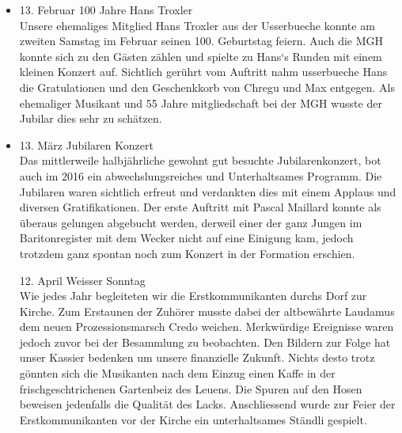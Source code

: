 \begin{history}
\begin{itemize}
            \item 13. Februar 100 Jahre Hans Troxler\\
                  Unsere ehemaliges Mitglied Hans Troxler aus der Usserbueche
                  konnte am zweiten Samstag im Februar seinen 100. Geburtstag
                  feiern. Auch die MGH konnte sich zu den Gästen zählen und
                  spielte zu Hans`s Runden  mit einem kleinen Konzert auf.
                  Sichtlich gerührt vom Auftritt nahm usserbueche Hans die
                  Gratulationen und den Geschenkkorb von Chregu und Max
                  entgegen. Als ehemaliger Musikant und 55 Jahre mitgliedschaft
                  bei der MGH wusste der Jubilar dies sehr zu schätzen.

            \item 13. März Jubilaren Konzert\\
                  Das mittlerweile halbjährliche gewohnt gut besuchte
                  Jubilarenkonzert, bot auch im 2016 ein abwechslungsreiches und
                  Unterhaltsames Programm. Die Jubilaren waren sichtlich erfreut
                  und verdankten dies mit einem Applaus und diversen
                  Gratifikationen. Der erste Auftritt mit Pascal Maillard konnte
                  als überaus gelungen abgebucht werden, derweil einer der ganz
                  Jungen im Baritonregister mit dem Wecker nicht auf eine
                  Einigung kam, jedoch trotzdem ganz spontan noch zum Konzert in
                  der Formation erschien.

                  12. April Weisser Sonntag\\
                  Wie jedes Jahr begleiteten wir die Erstkommunikanten durchs
                  Dorf zur Kirche. Zum Erstaunen der Zuhörer musste dabei der
                  altbewährte Laudamus dem neuen Prozessionsmarsch Credo
                  weichen. Merkwürdige Ereignisse waren jedoch zuvor bei der
                  Besammlung zu beobachten. Den Bildern zur Folge hat unser
                  Kassier bedenken um unsere finanzielle Zukunft. Nichts desto
                  trotz gönnten sich die Musikanten nach dem Einzug einen Kaffe
                  in der frischgeschtrichenen Gartenbeiz des Leuens. Die Spuren
                  auf den Hosen beweisen jedenfalls die Qualität des Lacks.
                  Anschliessend wurde zur Feier der Erstkommunikanten vor der
                  Kirche ein unterhaltsames Ständli gespielt.


\end{itemize}
\end{history}
